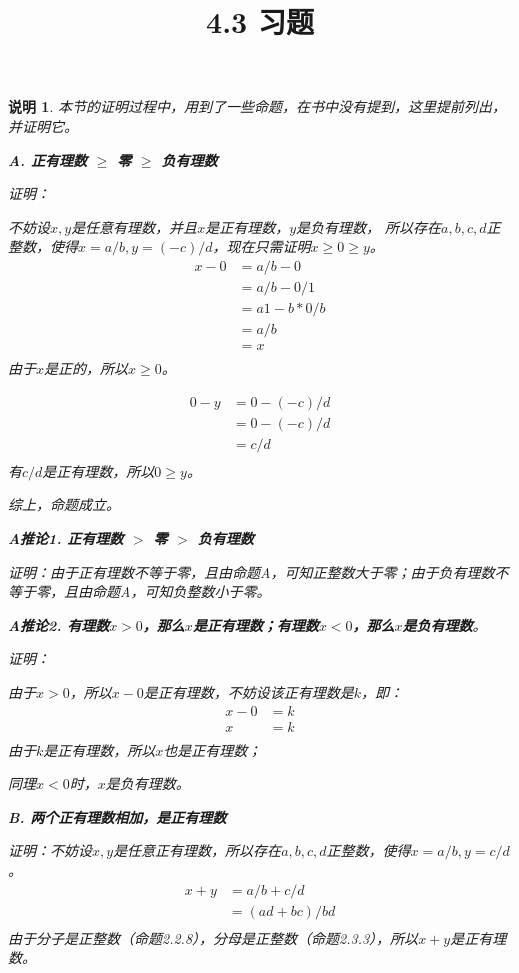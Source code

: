 \documentclass{article}
\theoremstyle{mystyle}
\newtheorem*{zremark}{说明}
\begin{document}
\title{4.3 习题}
\maketitle

\begin{zgraytheorem}
  \begin{zremark}
    本节的证明过程中，用到了一些命题，在书中没有提到，这里提前列出，并证明它。

    \textbf{A. 正有理数 $\geq$ 零 $\geq$ 负有理数}

    证明：

    不妨设$x,y$是任意有理数，并且$x$是正有理数，$y$是负有理数，
    所以存在$a,b,c,d$正整数，使得$x=a/b,y=(-c)/d$，现在只需证明$x \geq 0 \geq y$。
    \begin{align*}
      x - 0 & = a/b - 0   \\
            & = a/b - 0/1 \\
            & = a1-b*0/b  \\
            & = a / b     \\
            & = x         \\
    \end{align*}
    由于$x$是正的，所以$x \geq 0$。

    \begin{align*}
      0 - y & = 0 - (-c)/d \\
            & = 0 - (-c)/d \\
            & = c/d        \\
    \end{align*}
    有$c/d$是正有理数，所以$0 \geq y$。

    综上，命题成立。

    \textbf{A推论1. 正有理数 $>$ 零 $>$ 负有理数}

    证明：由于正有理数不等于零，且由命题A，可知正整数大于零；由于负有理数不等于零，且由命题A，可知负整数小于零。

    \textbf{A推论2. 有理数$x>0$，那么$x$是正有理数；有理数$x < 0$，那么$x$是负有理数}。

    证明：

    由于$x>0$，所以$x-0$是正有理数，不妨设该正有理数是$k$，即：
    \begin{align*}
      x-0 & = k \\
      x   & = k \\
    \end{align*}
    由于$k$是正有理数，所以$x$也是正有理数；

    同理$x < 0$时，$x$是负有理数。


    \textbf{B. 两个正有理数相加，是正有理数}

    证明：不妨设$x,y$是任意正有理数，所以存在$a,b,c,d$正整数，使得$x=a/b,y=c/d$。
    \begin{align*}
      x + y & = a/b + c/d      \\
            & = (ad + bc) / bd \\
    \end{align*}
    由于分子是正整数（命题2.2.8），分母是正整数（命题2.3.3），所以$x+y$是正有理数。


  \end{zremark}
\end{zgraytheorem}
\end{document}

